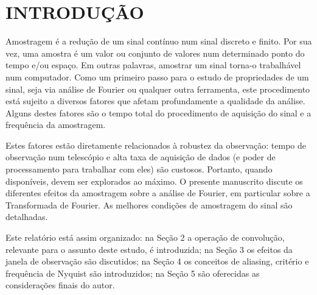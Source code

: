 
\chapter{INTRODUÇÃO}

Amostragem é a redução de um sinal contínuo num sinal discreto e finito. Por sua vez, uma amostra é um valor ou conjunto de valores num determinado ponto do tempo e/ou espaço. Em outras palavras, amostrar um sinal torna-o trabalhável num computador. Como um primeiro passo para o estudo de propriedades de um sinal, seja via análise de Fourier ou qualquer outra ferramenta, este procedimento está sujeito a diversos fatores que afetam profundamente a qualidade da análise. Alguns destes fatores são o tempo total do procedimento de aquisição do sinal e a frequência da amostragem. 

Estes fatores estão diretamente relacionados à robustez da observação: tempo de observação num telescópio e alta taxa de aquisição de dados (e poder de processamento para trabalhar com eles) são custosos. Portanto, quando disponíveis, devem ser explorados ao máximo. O presente manuscrito discute os diferentes efeitos da amostragem sobre a análise de Fourier, em particular sobre a Transformada de Fourier. As melhores condições de amostragem do sinal são detalhadas.

Este relatório está assim organizado: na Seção 2 a operação de convolução, relevante para o assunto deste estudo, é introduzida; na Seção 3 os efeitos da janela de observação são discutidos; na Seção 4 os conceitos de aliasing, critério e frequência de Nyquist são introduzidos; na Seção 5 são oferecidas as considerações finais do autor.



